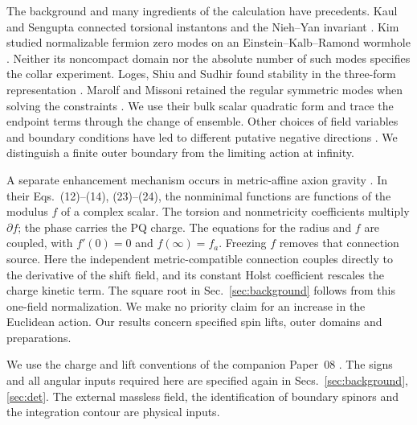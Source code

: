The background and many ingredients of the calculation have precedents. Kaul and Sengupta connected torsional instantons and the Nieh--Yan invariant \cite{Kaul}. Kim studied normalizable fermion zero modes on an Einstein--Kalb--Ramond wormhole \cite{Kim}. Neither its noncompact domain nor the absolute number of such modes specifies the collar experiment. Loges, Shiu and Sudhir found stability in the three-form representation \cite{LSS}. Marolf and Missoni retained the regular symmetric modes when solving the constraints \cite{MM}. We use their bulk scalar quadratic form and trace the endpoint terms through the change of ensemble. Other choices of field variables and boundary conditions have led to different putative negative directions \cite{HTV}. We distinguish a finite outer boundary from the limiting action at infinity.

A separate enhancement mechanism occurs in metric-affine axion gravity \cite{TY}. In their Eqs.~(12)--(14), (23)--(24), the nonminimal functions are functions of the modulus $f$ of a complex scalar. The torsion and nonmetricity coefficients multiply $\partial f$; the phase carries the PQ charge. The equations for the radius and $f$ are coupled, with $f'(0)=0$ and $f(\infty)=f_a$. Freezing $f$ removes that connection source. Here the independent metric-compatible connection couples directly to the derivative of the shift field, and its constant Holst coefficient rescales the charge kinetic term. The square root in Sec.~\ref{sec:background} follows from this one-field normalization. We make no priority claim for an increase in the Euclidean action. Our results concern specified spin lifts, outer domains and preparations.

We use the charge and lift conventions of the companion Paper~08 \cite{P08}. The signs and all angular inputs required here are specified again in Secs.~\ref{sec:background}, \ref{sec:det}. The external massless field, the identification of boundary spinors and the integration contour are physical inputs.
